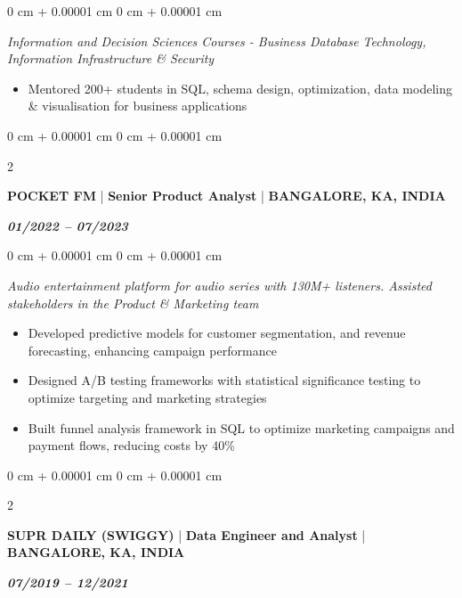 \documentclass[10pt, letterpaper]{article}
\newenvironment{highlights}{
    \begin{itemize}[
        topsep=0.10 cm,
        parsep=0.10 cm,
        partopsep=0pt,
        itemsep=0pt,
        leftmargin=0 cm + 10pt
    ]
}{
    \end{itemize}
} %
\newenvironment{onecolentry}{
    \begin{adjustwidth}{
        0 cm + 0.00001 cm
    }{
        0 cm + 0.00001 cm
    }
}{
    \end{adjustwidth}
} %
\newenvironment{twocolentry}[2][]{
    \onecolentry
    \def\secondColumn{#2}
    \setcolumnwidth{\fill, 4.5 cm}
    \begin{paracol}{2}
}{
    \switchcolumn \raggedleft \secondColumn
    \end{paracol}
    \endonecolentry
} %
\begin{document}
\vspace{0.10 cm}

\begin{onecolentry}
    \textit{Information and Decision Sciences Courses - Business Database Technology, Information Infrastructure \& Security}
     \begin{highlights}
                \item Mentored 200+ students in SQL, schema design, optimization, data modeling \& visualisation for business applications
     \end{highlights}
   \end{onecolentry}
\vspace{0.10 cm}
 
 \begin{twocolentry}{\textit{\textbf{01/2022 – 07/2023}}}
    \textbf{POCKET FM} | \textbf{Senior Product Analyst} | \textbf{BANGALORE, KA, INDIA}
    
\end{twocolentry}

\vspace{0.10 cm}

\begin{onecolentry}
    \textit{Audio entertainment platform for audio series with 130M+ listeners. Assisted stakeholders in the Product \& Marketing team}
     \begin{highlights}
                \item Developed predictive models for customer segmentation, and revenue forecasting, enhancing campaign performance
     \end{highlights}
      \begin{highlights}
                \item Designed A/B testing frameworks with statistical significance testing to optimize targeting and marketing strategies
     \end{highlights}
      \begin{highlights}
                \item Built funnel analysis framework in SQL to optimize marketing campaigns and payment flows, reducing costs by 40\%
     \end{highlights}
   \end{onecolentry}
\vspace{0.10 cm}
\begin{twocolentry}{\textbf{\textit{07/2019 – 12/2021}}}
    \textbf{SUPR DAILY (SWIGGY)} | \textbf{Data Engineer and Analyst} | \textbf{BANGALORE, KA, INDIA} 
   
\end{twocolentry}
\end{document}
